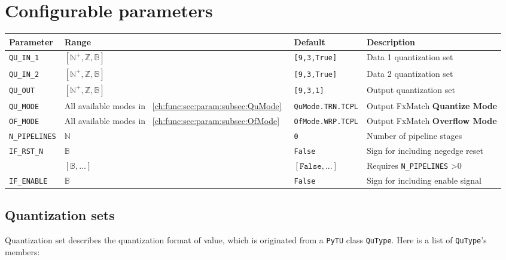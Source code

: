 \documentclass[a4paper, oneside]{report}
\begin{document}
        \section{Configurable parameters}
            \begin{longtable}{llll}
                \toprule
                \textbf{Parameter}  & \textbf{Range}  & \textbf{Default} & \textbf{Description} \\
                \midrule
                
                \texttt{QU\_IN\_1}     & $[\mathbb{N}^{+}, \mathbb{Z}, \mathbb{B}]$  & \texttt{[9,3,True]}                      &  Data 1 quantization set \\
                \texttt{QU\_IN\_2}    & $[\mathbb{N}^{+}, \mathbb{Z}, \mathbb{B}]$  & \texttt{[9,3,True]}                      & Data 2 quantization set \\
                \texttt{QU\_OUT}     & $[\mathbb{N}^{+}, \mathbb{Z}, \mathbb{B}]$  & \texttt{[9,3,1]}                      & Output quantization set \\
                \texttt{QU\_MODE}    & All available modes in ~\ref{ch:func:sec:param:subsec:QuMode}~       & \texttt{QuMode.TRN.TCPL}     & Output FxMatch \textbf{Quantize Mode} \\
                \texttt{OF\_MODE}   &  All available modes in  ~\ref{ch:func:sec:param:subsec:OfMode}~     & \texttt{OfMode.WRP.TCPL} & Output FxMatch \textbf{Overflow Mode}          \\
                \texttt{N\_PIPELINES}  & $\mathbb{N}$  & \texttt{0}  & Number of pipeline stages \\
                \texttt{IF\_RST\_N}  & $\mathbb{B}$  & \texttt{False}  & Sign for including negedge reset \\
                                    & $[\mathbb{B}, ...]$ & $[\texttt{False}, ...]$ & Requires \texttt{N\_PIPELINES} >0      \\    
                \texttt{IF\_ENABLE}  & $\mathbb{B}$  & \texttt{False}  & Sign for including enable signal \\
                \bottomrule
            \end{longtable}
            \subsection{Quantization sets}\label{ch:func:sec:param:subsec:QuSet}
                Quantization set describes the quantization format of value, which is originated from a \texttt{PyTU} class \texttt{QuType}. Here is a list of \texttt{QuType}'s members:
\end{document}
